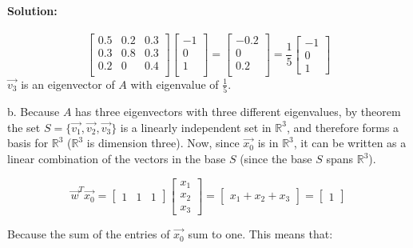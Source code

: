 \documentclass[12pt, letterpaper]{article}
\newcommand{\R}{\mathbb{R}}
\theoremstyle{statement}
\theoremstyle{statement}
\newenvironment{Solution}{\noindent\ignorespaces\paragraph{Solution:}}{\hfill \ding{122}\par\noindent}
\begin{document}
\begin{Solution}
    $$
    \begin{bmatrix}
    0.5 & 0.2 & 0.3 \\
    0.3 & 0.8 & 0.3 \\
    0.2 &   0 & 0.4 \\
    \end{bmatrix}
    \begin{bmatrix}
    -1 \\
    0 \\
    1 \\
    \end{bmatrix}
    =
    \begin{bmatrix}
    -0.2 \\
    0 \\
    0.2 \\
    \end{bmatrix}
    = \frac{1}{5}
    \begin{bmatrix}
    -1 \\
    0 \\
    1
    \end{bmatrix}
    $$
    $\vec{v_3}$ is an eigenvector of $A$ with eigenvalue of $\frac{1}{5}$.
    
    b. Because $A$ has three eigenvectors with three different eigenvalues, by theorem the set $S=\{\vec{v_1}, \vec{v_2}, \vec{v_3}\}$ is a linearly independent set in $\R^3$, and therefore forms a basis for $\R^3$ ($\R^3$ is dimension three). Now, since $\vec{x_0}$ is in $\R^3$, it can be written as a linear combination of the vectors in the base $S$ (since the base $S$ spans $\R^3$).
    
    $$
    \vec{w}^T\vec{x_0} =
    \begin{bmatrix} 1 & 1 & 1 \end{bmatrix}
    \begin{bmatrix} x_1 \\ x_2 \\ x_3 \end{bmatrix}
    = \begin{bmatrix} x_1+x_2+x_3 \end{bmatrix} 
    = \begin{bmatrix} 1 \end{bmatrix}
    $$
    
    Because the sum of the entries of $\vec{x_0}$ sum to one. This means that:
    

\end{Solution}
\end{document}
